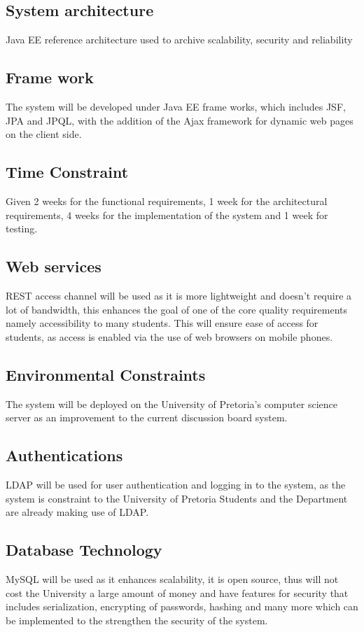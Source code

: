 \begin{flushleft}
			
\subsection*{System architecture} 
Java EE reference architecture used to archive scalability, security and reliability 

\subsection*{Frame work}
The system will be developed under Java EE frame works, which includes JSF, JPA and JPQL, with the addition of the Ajax framework for dynamic web pages on the client side.

\subsection*{Time Constraint} 
Given 2 weeks for the functional requirements, 1 week for the architectural requirements, 4 weeks for the implementation of the system and 1 week for testing.

\subsection*{Web services}
REST access channel will be used as it is more lightweight and doesn't require a lot of bandwidth, this enhances the goal of one of the core quality requirements namely accessibility to many students. This will ensure ease of access for students, as access is enabled via the use of web browsers on mobile phones.

\subsection*{Environmental Constraints}
The system will be deployed on the University of Pretoria's computer science server as an improvement to the current discussion board system.

\subsection*{Authentications}
LDAP will be used for user authentication and logging in to the system, as the system is constraint to the University of Pretoria Students and the Department are already making use of LDAP.

\subsection*{Database Technology}
MySQL will be used as it enhances scalability, it is open source, thus will not cost the University a large amount of money and have features for security that includes serialization, encrypting of passwords, hashing and many more which can be implemented to the strengthen the security of the system.
		
\end{flushleft}
